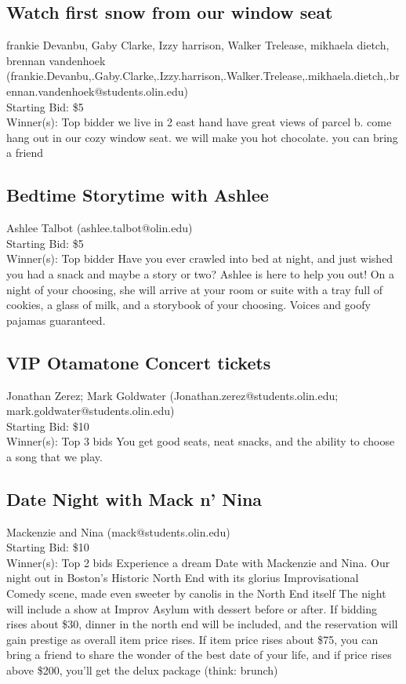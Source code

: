 \documentclass[11pt]{article}
\begin{document}
\subsection{Watch first snow from our window seat}
frankie Devanbu, Gaby Clarke, Izzy harrison, Walker Trelease, mikhaela dietch, brennan vandenhoek (frankie.Devanbu,.Gaby.Clarke,.Izzy.harrison,.Walker.Trelease,.mikhaela.dietch,.brennan.vandenhoek@students.olin.edu) \\
Starting Bid: \$5 \\
Winner(s): 
Top bidder\newline
we live in 2 east hand have great views of parcel b. come hang out in our cozy window seat. we will make you hot chocolate. you can bring a friend
\subsection{Bedtime Storytime with Ashlee}
Ashlee Talbot (ashlee.talbot@olin.edu) \\
Starting Bid: \$5 \\
Winner(s): 
Top bidder\newline
Have you ever crawled into bed at night, and just wished you had a snack and maybe a story or two? Ashlee is here to help you out! On a night of your choosing, she will arrive at your room or suite with a tray full of cookies, a glass of milk, and a storybook of your choosing. Voices and goofy pajamas guaranteed.
\subsection{VIP Otamatone Concert tickets}
Jonathan Zerez; Mark Goldwater (Jonathan.zerez@students.olin.edu; mark.goldwater@students.olin.edu) \\
Starting Bid: \$10 \\
Winner(s): 
Top 3 bids\newline
You get good seats, neat snacks, and the ability to choose a song that we play.
\subsection{Date Night with Mack n' Nina}
Mackenzie and Nina (mack@students.olin.edu) \\
Starting Bid: \$10 \\
Winner(s): 
Top 2 bids\newline
Experience a dream Date with Mackenzie and Nina. Our night out in Boston's Historic North End with its glorius Improvisational Comedy scene, made even sweeter by canolis in the North End itself  The night will include a show at Improv Asylum with dessert before or after. If bidding rises about \$30, dinner in the north end will be included, and the reservation will gain prestige as overall item price rises. If item price rises about \$75, you can bring a friend to share the wonder of the best date of your life, and if price rises above \$200, you'll get the delux package (think: brunch)
\end{document}
